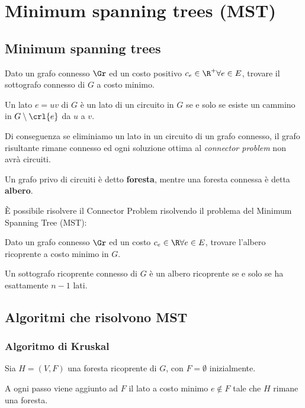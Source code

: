 \documentclass[\main/main.tex]{subfiles}
\begin{document}
\chapter{Minimum spanning trees (MST)}
\section{Minimum spanning trees}
\begin{problem}
Dato un grafo connesso \(\Gr \) ed un costo positivo \(c_e \in \R^+ \forall e \in E\), trovare il sottografo connesso di \(G\) a costo minimo.
\end{problem}
\begin{lemma}
  Un lato \(e = uv\) di \(G\) è un lato di un circuito in \(G\) se e solo se esiste un cammino in \(G \setminus \crl{e}\) da \(u\) a \(v\).
\end{lemma}
Di conseguenza se eliminiamo un lato in un circuito di un grafo connesso, il grafo risultante rimane connesso ed ogni soluzione ottima al \textit{connector problem} non avrà circuiti.
\begin{definition}
  Un grafo privo di circuiti è detto \textbf{foresta}, mentre una foresta connessa è detta \textbf{albero}.
\end{definition}
È possibile risolvere il Connector Problem risolvendo il problema del Minimum Spanning Tree (MST):
\begin{problem}
Dato un grafo connesso \(\Gr \) ed un costo \(c_e \in \R \forall e \in E\), trovare l'albero ricoprente a costo minimo in \(G\).
\end{problem}
\begin{lemma}
  Un sottografo ricoprente connesso di \(G\) è un albero ricoprente se e solo se ha esattamente \(n -1\) lati.
\end{lemma}
\clearpage
\section{Algoritmi che risolvono MST}
\subsection{Algoritmo di Kruskal}
Sia \(H = (V, F)\) una foresta ricoprente di \(G\), con \(F=\emptyset \) inizialmente.

A ogni passo viene aggiunto ad \(F\) il lato a costo minimo \(e \not\in F\) tale che \(H\) rimane una foresta.
\end{document}
